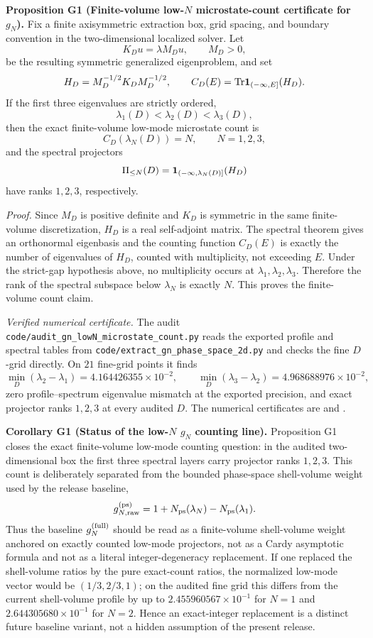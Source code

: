 \documentclass[aps,prd,onecolumn,notitlepage,nofootinbib,superscriptaddress,11pt,floatfix]{revtex4-2}
\newcommand{\Tr}{\mathrm{Tr}}
\begin{document}
\medskip\noindent\textbf{Proposition G1 (Finite-volume low-\(N\) microstate-count certificate for \(g_N\)).}
Fix a finite axisymmetric extraction box, grid spacing, and boundary convention in the two-dimensional localized solver.  Let
\[
K_D u=\lambda M_D u,\qquad M_D>0,
\]
be the resulting symmetric generalized eigenproblem, and set
\[
H_D=M_D^{-1/2}K_D M_D^{-1/2},\qquad
C_D(E)=\Tr {\bf 1}_{(-\infty,E]}(H_D).
\]
If the first three eigenvalues are strictly ordered,
\[
\lambda_1(D)<\lambda_2(D)<\lambda_3(D),
\]
then the exact finite-volume low-mode microstate count is
\[
C_D(\lambda_N(D))=N,\qquad N=1,2,3,
\]
and the spectral projectors
\[
\Pi_{\le N}(D)={\bf 1}_{(-\infty,\lambda_N(D)]}(H_D)
\]
have ranks \(1,2,3\), respectively.

\emph{Proof.}
Since \(M_D\) is positive definite and \(K_D\) is symmetric in the same finite-volume discretization, \(H_D\) is a real self-adjoint matrix.  The spectral theorem gives an orthonormal eigenbasis and the counting function \(C_D(E)\) is exactly the number of eigenvalues of \(H_D\), counted with multiplicity, not exceeding \(E\).  Under the strict-gap hypothesis above, no multiplicity occurs at \(\lambda_1,\lambda_2,\lambda_3\).  Therefore the rank of the spectral subspace below \(\lambda_N\) is exactly \(N\).  This proves the finite-volume count claim.

\emph{Verified numerical certificate.}
The audit \texttt{code/audit\_gn\_lowN\_microstate\_count.py} reads the exported profile and spectral tables from \texttt{code/extract\_gn\_phase\_space\_2d.py} and checks the fine \(D\)-grid directly.  On \(21\) fine-grid points it finds
\[
\min_D(\lambda_2-\lambda_1)=4.164426355\times10^{-2},\qquad
\min_D(\lambda_3-\lambda_2)=4.968688976\times10^{-2},
\]
zero profile--spectrum eigenvalue mismatch at the exported precision, and exact projector ranks \(1,2,3\) at every audited \(D\).  The numerical certificates are  and .

\medskip\noindent\textbf{Corollary G1 (Status of the low-\(N\) \(g_N\) counting line).}
Proposition G1 closes the exact finite-volume low-mode counting question: in the audited two-dimensional box the first three spectral layers carry projector ranks \(1,2,3\).  This count is deliberately separated from the bounded phase-space shell-volume weight used by the release baseline,
\[
g_{N,\rm raw}^{\rm(ps)}=1+N_{\rm ps}(\lambda_N)-N_{\rm ps}(\lambda_1).
\]
Thus the baseline \(g_N^{\rm(full)}\) should be read as a finite-volume shell-volume weight anchored on exactly counted low-mode projectors, not as a Cardy asymptotic formula and not as a literal integer-degeneracy replacement.  If one replaced the shell-volume ratios by the pure exact-count ratios, the normalized low-mode vector would be \((1/3,2/3,1)\); on the audited fine grid this differs from the current shell-volume profile by up to \(2.455960567\times10^{-1}\) for \(N=1\) and \(2.644305680\times10^{-1}\) for \(N=2\).  Hence an exact-integer replacement is a distinct future baseline variant, not a hidden assumption of the present release.
\end{document}
